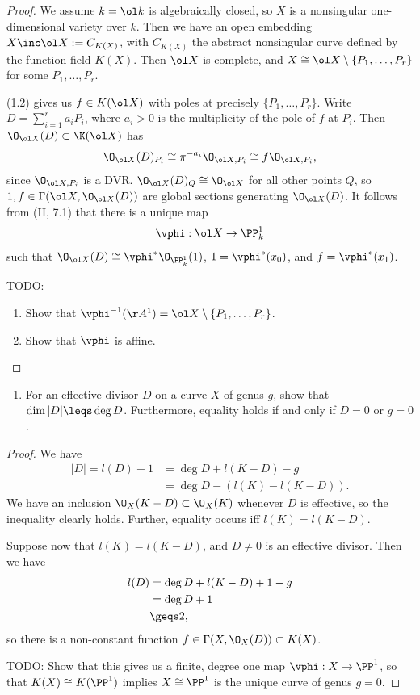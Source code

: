 \documentclass[12pt]{amsart}
\begin{document}
\begin{proof}
  We assume $k=\ol k$ is algebraically closed, so $X$ is a nonsingular one-dimensional variety over $k$.
  Then we have an open embedding $X\inc \ol X:= C_{K(X)}$, with $C_{K(X)}$ the abstract nonsingular curve defined by the function field $K(X)$.
  Then $\ol X$ is complete, and $X\cong \ol X\setminus \{P_1,\ldots, P_r\}$ for some $P_1,\ldots, P_r$.

  (1.2) gives us $f\in K(\ol X)$ with poles at precisely $\{P_1,\ldots, P_r\}$.
  Write $D=\sum_{i=1}^r a_i P_i$, where $a_i>0$ is the multiplicity of the pole of $f$ at $P_i$.
  Then $\O_{\ol X}(D)\subset \K(\ol X)$ has
  \[
    \O_{\ol X}(D)_{P_i}\cong \pi^{-a_i}\O_{\ol X,P_i}\cong f\O_{\ol X,P_i},
  \] 
  since $\O_{\ol X,P_i}$ is a DVR.
  $\O_{\ol X}(D)_Q\cong \O_{\ol X}$ for all other points $Q$, so $1,f\in \Gamma(\ol X, \O_{\ol X}(D))$ are global sections generating $\O_{\ol X}(D)$.
  It follows from (II, 7.1) that there is a unique map
  \begin{align*}
    \vphi: \ol X\to \PP^1_k
  \end{align*}
  such that $\O_{\ol X}(D)\cong \vphi^*\O_{\PP_k^1}(1)$, $1=\vphi^*(x_0)$, and $f = \vphi^*(x_1)$.

  TODO: 
  \begin{enumerate}
    \item Show that $\vphi^{-1}(\AA^1)= \ol X\setminus \{P_1,\ldots, P_r\}$.
    \item Show that $\vphi$ is affine.
  \end{enumerate}
\end{proof}

\begin{enumerate}
	\item[5.] {
      For an effective divisor $D$ on a curve $X$ of genus $g$, show that $\dim |D|\leqs \deg D$.
      Furthermore, equality holds if and only if $D=0$ or $g=0$.
    }
\end{enumerate}

\begin{proof}
  We have
  \begin{align*}
    |D| = l(D) - 1 &= \deg D + l(K-D) -g \\
                   &= \deg D - (l(K) - l(K-D)).
  \end{align*}
  We have an inclusion $\O_X(K-D)\subset \O_X(K)$ whenever $D$ is effective, so the inequality clearly holds.
  Further, equality occurs iff $l(K)=l(K-D)$.

  Suppose now that $l(K)=l(K-D)$, and $D\neq 0$ is an effective divisor.
  Then we have
  \begin{align*}
    l(D) &= \deg D +  l(K-D) +1 -g \\
         &= \deg D+1 \\
         &\geqs 2,
  \end{align*}
  so there is a non-constant function $f\in \Gamma(X,\O_X(D))\subset K(X)$.

  TODO: Show that this gives us a finite, degree one map $\vphi:X\to \PP^1$, so that $K(X)\cong K(\PP^1)$ implies $X\cong \PP^1$ is the unique curve of genus $g=0$.
\end{proof}
\end{document}
